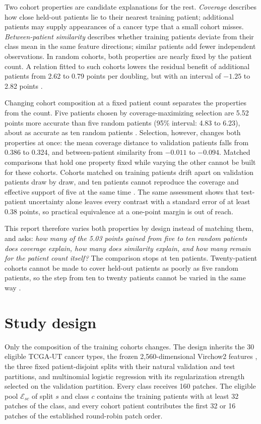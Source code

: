 \documentclass[11pt]{article}
\begin{document}
Two cohort properties are candidate explanations for the rest. \emph{Coverage} describes how close held-out patients lie to their nearest training patient; additional patients may supply appearances of a cancer type that a small cohort misses. \emph{Between-patient similarity} describes whether training patients deviate from their class mean in the same feature directions; similar patients add fewer independent observations. In random cohorts, both properties are nearly fixed by the patient count. A relation fitted to such cohorts lowers the residual benefit of additional patients from 2.62 to 0.79 points per doubling, but with an interval of $-1.25$ to 2.82 points \citep{queisler2026coverageRedundancy}.

Changing cohort composition at a fixed patient count separates the properties from the count. Five patients chosen by coverage-maximizing selection are 5.52 points more accurate than five random patients (95\% interval: 4.83 to 6.23), about as accurate as ten random patients \citep{queisler2026shortageSelection}. Selection, however, changes both properties at once: the mean coverage distance to validation patients falls from 0.386 to 0.324, and between-patient similarity from $-0.011$ to $-0.094$. Matched comparisons that hold one property fixed while varying the other cannot be built for these cohorts. Cohorts matched on training patients drift apart on validation patients draw by draw, and ten patients cannot reproduce the coverage and effective support of five at the same time \citep{queisler2026coverageSimilarity}. The same assessment shows that test-patient uncertainty alone leaves every contrast with a standard error of at least 0.38 points, so practical equivalence at a one-point margin is out of reach.

This report therefore varies both properties by design instead of matching them, and asks: \emph{how many of the 5.03 points gained from five to ten random patients does coverage explain, how many does similarity explain, and how many remain for the patient count itself?} The comparison stops at ten patients. Twenty-patient cohorts cannot be made to cover held-out patients as poorly as five random patients, so the step from ten to twenty patients cannot be varied in the same way \citep{queisler2026coverageSimilarity}.

\section{Study design}
\label{sec:design}
Only the composition of the training cohorts changes. The design inherits the 30 eligible TCGA-UT cancer types, the frozen 2,560-dimensional Virchow2 features \citep{zimmermann2024virchow2}, the three fixed patient-disjoint splits with their natural validation and test partitions, and multinomial logistic regression with its regularization strength selected on the validation partition. Every class receives 160 patches. The eligible pool $\mathcal E_{sc}$ of split $s$ and class $c$ contains the training patients with at least 32 patches of the class, and every cohort patient contributes the first 32 or 16 patches of the established round-robin patch order.
\end{document}
